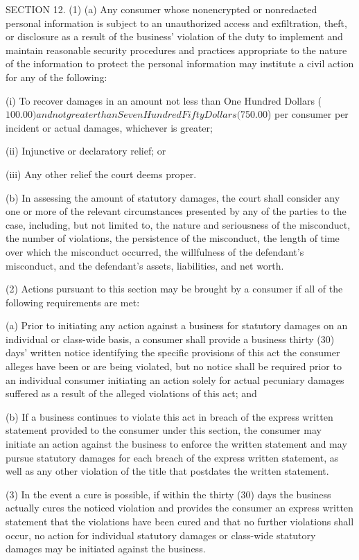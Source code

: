      SECTION 12.  (1)  (a)  Any consumer whose nonencrypted or nonredacted personal information is subject to an unauthorized access and exfiltration, theft, or disclosure as a result of the business' violation of the duty to implement and maintain reasonable security procedures and practices appropriate to the nature of the information to protect the personal information may institute a civil action for any of the following:

               (i)  To recover damages in an amount not less than One Hundred Dollars ($100.00) and not greater than Seven Hundred Fifty Dollars ($750.00) per consumer per incident or actual damages, whichever is greater;

              (ii)  Injunctive or declaratory relief; or

               (iii)  Any other relief the court deems proper.

          (b)  In assessing the amount of statutory damages, the court shall consider any one or more of the relevant circumstances presented by any of the parties to the case, including, but not limited to, the nature and seriousness of the misconduct, the number of violations, the persistence of the misconduct, the length of time over which the misconduct occurred, the willfulness of the defendant's misconduct, and the defendant's assets, liabilities, and net worth.

     (2)  Actions pursuant to this section may be brought by a consumer if all of the following requirements are met:

          (a)  Prior to initiating any action against a business for statutory damages on an individual or class-wide basis, a consumer shall provide a business thirty (30) days' written notice identifying the specific provisions of this act the consumer alleges have been or are being violated, but no notice shall be required prior to an individual consumer initiating an action solely for actual pecuniary damages suffered as a result of the alleged violations of this act; and

          (b)  If a business continues to violate this act in breach of the express written statement provided to the consumer under this section, the consumer may initiate an action against the business to enforce the written statement and may pursue statutory damages for each breach of the express written statement, as well as any other violation of the title that postdates the written statement.

     (3)  In the event a cure is possible, if within the thirty (30) days the business actually cures the noticed violation and provides the consumer an express written statement that the violations have been cured and that no further violations shall occur, no action for individual statutory damages or class-wide statutory damages may be initiated against the business.


